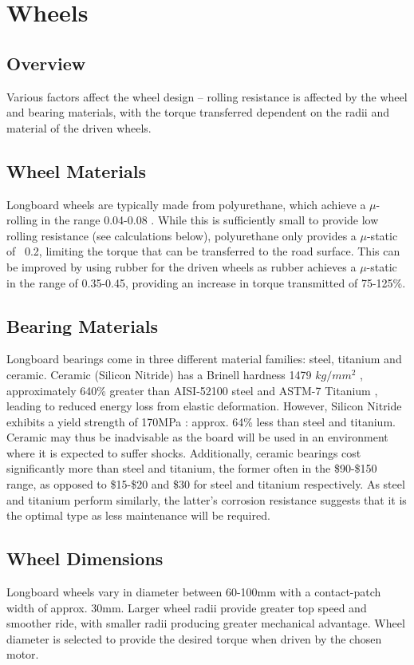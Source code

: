 \documentclass[journal,10pt]{IEEEtran}
\begin{document}
\section{Wheels}
    \subsection{Overview}
        Various factors affect the wheel design – rolling resistance is affected by the wheel and bearing materials, with the torque transferred dependent on the radii and material of the driven wheels.
    \subsection{Wheel Materials}
        Longboard wheels are typically made from polyurethane, which achieve a $\mu$-rolling in the range 0.04-0.08 \cite{wheel_data}. While this is sufficiently small to provide low rolling resistance (see calculations below), polyurethane only provides a $\mu$-static of ~0.2, limiting the torque that can be transferred to the road surface. This can be improved by using rubber for the driven wheels as rubber achieves a $\mu$-static in the range of 0.35-0.45, providing an increase in torque transmitted of 75-125\%.
    \subsection{Bearing Materials}
        Longboard bearings come in three different material families: steel, titanium and ceramic. Ceramic (Silicon Nitride) has a Brinell hardness 1479 $kg/mm^{2}$ \cite{ceramic_data1}, approximately 640\% greater than AISI-52100 steel \cite{steel_data} and ASTM-7 Titanium \cite{titanium_data}, leading to reduced energy loss from elastic deformation.  However, Silicon Nitride exhibits a yield strength of 170MPa \cite{ceramic_data2}: approx. 64\% less than steel and titanium. Ceramic may thus be inadvisable as the board will be used in an environment where it is expected to suffer shocks. Additionally, ceramic bearings cost significantly more than steel and titanium, the former often in the \$90-\$150 range, as opposed to \$15-\$20 and \$30 for steel and titanium respectively. As steel and titanium perform similarly, the latter’s corrosion resistance suggests that it is the optimal type as less maintenance will be required. 
    \subsection{Wheel Dimensions}
        Longboard wheels vary in diameter between 60-100mm with a contact-patch width of approx. 30mm. Larger wheel radii provide greater top speed and smoother ride, with smaller radii producing greater mechanical advantage. 
        Wheel diameter is selected to provide the desired torque when driven by the chosen motor.
\end{document}
